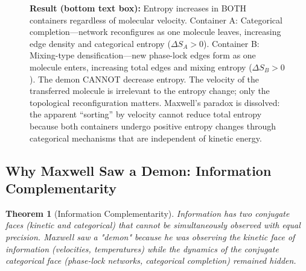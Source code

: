 \documentclass[12pt,a4paper]{article}
\newtheorem{theorem}{Theorem}[section]
\theoremstyle{definition}
\theoremstyle{remark}
\begin{document}
\begin{figure}[htbp]
{\textbf{Result (bottom text box):} Entropy increases in BOTH containers regardless of molecular velocity. Container A: Categorical completion—network reconfigures as one molecule leaves, increasing edge density and categorical entropy ($\Delta S_A > 0$). Container B: Mixing-type densification—new phase-lock edges form as one molecule enters, increasing total edges and mixing entropy ($\Delta S_B > 0$). The demon CANNOT decrease entropy. The velocity of the transferred molecule is irrelevant to the entropy change; only the topological reconfiguration matters. Maxwell's paradox is dissolved: the apparent ``sorting'' by velocity cannot reduce total entropy because both containers undergo positive entropy changes through categorical mechanisms that are independent of kinetic energy.}
\label{fig:maxwell_demon_resolution}
\end{figure}

\subsection{Why Maxwell Saw a Demon: Information Complementarity}

\begin{theorem}[Information Complementarity]
\label{thm:information_complementarity}
Information has two conjugate faces (kinetic and categorical) that cannot be simultaneously observed with equal precision. Maxwell saw a "demon" because he was observing the kinetic face of information (velocities, temperatures) while the dynamics of the conjugate categorical face (phase-lock networks, categorical completion) remained hidden.
\end{theorem}
\end{document}
